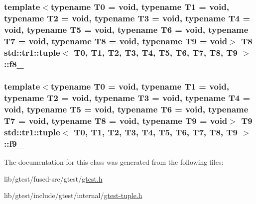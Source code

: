 \hypertarget{classstd_1_1tr1_1_1tuple_a335bd9d920b8aff1e2a47980bbf274db}{
\subsubsection[{f8\-\_\-}]{\setlength{\rightskip}{0pt plus 5cm}template$<$typename T0 = void, typename T1 = void, typename T2 = void, typename T3 = void, typename T4 = void, typename T5 = void, typename T6 = void, typename T7 = void, typename T8 = void, typename T9 = void$>$ T8 {\bf std\-::tr1\-::tuple}$<$ T0, T1, T2, T3, T4, T5, T6, T7, T8, T9 $>$\-::f8\-\_\-}}\label{classstd_1_1tr1_1_1tuple_a335bd9d920b8aff1e2a47980bbf274db}
\hypertarget{classstd_1_1tr1_1_1tuple_a1b8a389f9e3974be4130f6ba2fbe5234}{
\subsubsection[{f9\-\_\-}]{\setlength{\rightskip}{0pt plus 5cm}template$<$typename T0 = void, typename T1 = void, typename T2 = void, typename T3 = void, typename T4 = void, typename T5 = void, typename T6 = void, typename T7 = void, typename T8 = void, typename T9 = void$>$ T9 {\bf std\-::tr1\-::tuple}$<$ T0, T1, T2, T3, T4, T5, T6, T7, T8, T9 $>$\-::f9\-\_\-}}\label{classstd_1_1tr1_1_1tuple_a1b8a389f9e3974be4130f6ba2fbe5234}


The documentation for this class was generated from the following files\-:\begin{DoxyCompactItemize}
\item 
lib/gtest/fused-\/src/gtest/\hyperlink{fused-src_2gtest_2gtest_8h}{gtest.\-h}\item 
lib/gtest/include/gtest/internal/\hyperlink{gtest-tuple_8h}{gtest-\/tuple.\-h}\end{DoxyCompactItemize}
